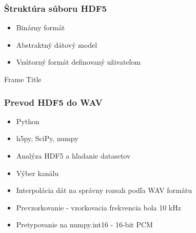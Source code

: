 \documentclass[%
  12pt,       				%
	t,                  %
	aspectratio=1610,   %
	unicode,						%
]{beamer}				    	%
\begin{document}
\begin{frame}
    \frametitle{Štruktúra súboru HDF5}
   
    {\small
    \label{dir:filestructure}
    }

    \begin{itemize}
        \item Binárny formát
        \item Abstraktný dátový model
        \item Vnútorný formát definovaný uživateľom
    \end{itemize}
\end{frame}

\begin{frame}{Frame Title}
    \frametitle{Prevod HDF5 do WAV}
    \begin{itemize}
        \item Python
        \item h5py, SciPy, numpy
        \item Analýza HDF5 a hľadanie datasetov
        \item Výber kanálu
        \item Interpolácia dát na správny rozsah podľa WAV formátu
        \item Prevzorkovanie - vzorkovacia frekvencia bola 10 kHz
        \item Pretypovanie na numpy.int16 - 16-bit PCM
    \end{itemize}
\end{frame}
\end{document}
